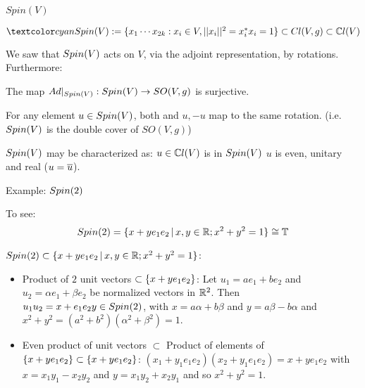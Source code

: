 \begin{frame}{$Spin(V)$} %

    \begin{Definition} $\defn{\spinv} := \set{x_1 \cdots x_{2k}: x_i \in V, ||x_i||^2 = x_i^* x_i = 1} \subset \clvg \subset \cclv$
    \end{Definition}
    
    We saw that $Spin(V)$ acts on $V$, via the adjoint representation, by rotations. Furthermore:
    
    \begin{proposition}
    The map $Ad|_{Spin(V)}: Spin(V) \to SO(V, g)$ is surjective.
    
    For any element $u \in Spin(V)$, both and $u, -u$ map to the same rotation. (i.e. $Spin(V)$ is the double cover of $SO(V, g)$)
    \end{proposition}
    
    $Spin(V)$ may be characterized as: $u \in \mathbb C l(V)$ is in $Spin(V)$ \iff $u$ is even, unitary and real ($u = \overline{u}$).
\end{frame}

\begin{frame}{Example: $Spin(2)$} %
    
    To see: \[Spin(2) = \{x + y e_1 e_2 \,|\, x, y \in \mathbb R;  x^2 + y^2 = 1\} \cong \mathbb T\]
    
    $Spin(2) \subset \{x + y e_1 e_2 \,|\, x, y \in \mathbb R;  x^2 + y^2 = 1\}$:
        \begin{itemize}
            
        \item Product of $2$ unit vectors $\subset \{x + y e_1 e_2\}$: Let $u_1 = a e_1 + b e_2$ and $u_2 = \alpha e_1 + \beta e_2$ be normalized vectors in $\mathbb R^2$. Then $u_1 u_2 = x + e_1 e_2 y \in Spin(2)$, with $x = a \alpha + b \beta$ and $y = a \beta  - b \alpha$ and $x^2 + y^2 = (a^2 + b^2)(\alpha^2 + \beta^2) = 1$.
        
        \item Even product of unit vectors $\subset$ Product of elements of $\{x + y e_1 e_2\} \subset \{x + y e_1 e_2\}$: $(x_1 + y_1 e_1 e_2)(x_2 + y_1 e_1 e_2) = x + y e_1 e_2$ with $x = x_1 y_1 - x_2 y_2$ and $y = x_1 y_2 + x_2 y_1$ and so $x^2 + y^2 = 1$.
            
        \end{itemize}
    
\end{frame}

